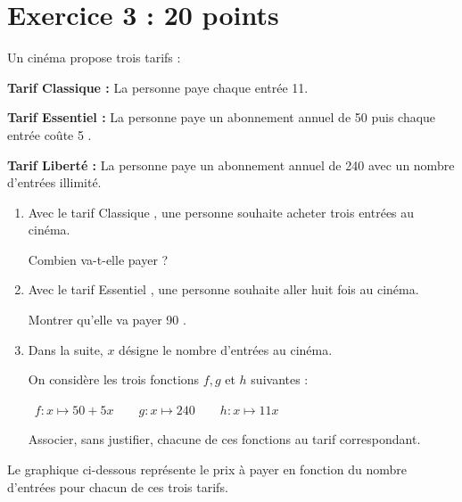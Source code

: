 \documentclass[11pt]{article}
\newcommand{\euro}{\eurologo{}}
\begin{document}
\section*{Exercice 3 : \hfill 20 points}
Un cinéma propose trois tarifs :

\textbf{Tarif \og{} Classique \fg{} :} La personne paye chaque entrée 11\euro{}.

	\textbf{Tarif \og{} Essentiel \fg{} :} La personne paye un abonnement annuel de 50 \euro{} puis chaque entrée coûte 5 \euro{}.

\textbf{Tarif \og{} Liberté \fg{} :} La personne paye un abonnement annuel de 240 \euro{} avec un nombre d'entrées illimité.

\begin{enumerate}
	\item Avec le tarif \og{} Classique \fg{}, une personne souhaite acheter trois entrées au cinéma.

	Combien va-t-elle payer ?

	\item Avec le tarif \og{} Essentiel \fg{}, une personne souhaite aller huit fois au cinéma.

	Montrer qu'elle va payer 90 \euro{}.

	\item Dans la suite, $x$ désigne le nombre d'entrées au cinéma.

	On considère les trois fonctions $f, g$ et $h$ suivantes :

	\hfill~$f: x \longmapsto 50+5 x \qquad g: x \longmapsto 240 \qquad h: x \longmapsto 11 x$\hfill~

	Associer, sans justifier, chacune de ces fonctions au tarif correspondant.
\end{enumerate}

Le graphique ci-dessous représente le prix à payer en fonction du nombre d'entrées pour chacun de ces trois tarifs.

\begin{center}
\end{center}
\end{document}
